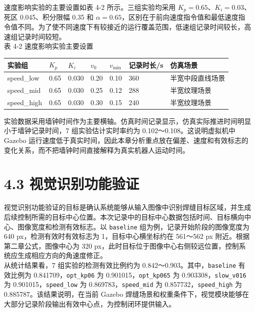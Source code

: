 \documentclass[UTF8,a4paper,12pt]{ctexrep}
\begin{document}
速度影响实验的主要设置如表 4-2 所示。三组实验均采用 $K_p=0.65$、$K_i=0.03$、死区 0.045、积分限幅 0.35 和 $\alpha=0.65$，区别在于前向速度指令值和最低速度指令值不同。为了使不同速度下有较接近的运行覆盖范围，低速组记录时间较长，高速组记录时间较短。\\

表 4-2 速度影响实验主要设置\\

\begin{longtable}{|p{}|p{}|p{}|p{}|p{}|p{}|p{}|}
\hline
实验组 & $K_p$ & $K_i$ & $v_0$ & $v_{\min}$ & 记录时长/s & 仿真场景 \\ \hline
speed\_low & 0.65 & 0.030 & 0.20 & 0.10 & 360 & 半宽中段直线场景 \\ \hline
speed\_mid & 0.65 & 0.030 & 0.25 & 0.12 & 288 & 半宽纹理场景 \\ \hline
speed\_high & 0.65 & 0.030 & 0.30 & 0.15 & 240 & 半宽纹理场景 \\ \hline
\end{longtable}

实验数据采用墙钟时间作为主要横轴。仿真时间记录显示，仿真实际推进时间明显小于墙钟记录时间，7 组实验估计实时率约为 0.102～0.108。这说明虚拟机中 Gazebo 运行速度低于真实时间，因此本章分析重点放在偏差、速度和有效标志的变化关系，而不把墙钟时间直接解释为真实机器人运动时间。\\

\section{4.3 视觉识别功能验证}

视觉识别功能验证的目标是确认系统能够从输入图像中识别焊缝目标区域，并生成后续控制所需的目标中心位置。本次记录中的目标中心数据包括时间、目标横向中心、图像宽度和检测有效标志。以 \texttt{baseline} 组为例，记录开始阶段的图像宽度为 640 px，检测有效时有效标志为 1，目标中心横坐标约在 561～562 px 附近。根据第二章公式，图像中心为 320 px，此时目标位于图像中心右侧较远位置，控制系统应生成相应方向的角速度修正。\\

从统计结果看，7 组实验的检测有效比例约为 0.842～0.903。其中，\texttt{baseline} 有效比例为 0.841709，\texttt{opt\_kp06} 为 0.901015，\texttt{opt\_kp065} 为 0.903308，\texttt{slow\_v016} 为 0.901015，\texttt{speed\_low} 为 0.869783，\texttt{speed\_mid} 为 0.857732，\texttt{speed\_high} 为 0.885787。该结果说明，在当前 Gazebo 焊缝场景和权重条件下，视觉模块能够在大部分记录阶段输出有效中心点，为控制闭环提供输入。\\
\end{document}
